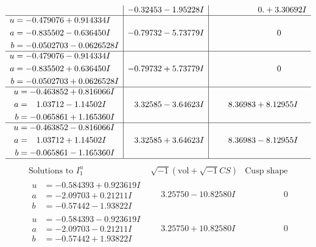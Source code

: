 \documentclass[1p]{elsarticle_modified}
\theoremstyle{definition}
\newcommand{\I}{\sqrt{-1}}
\begin{document}
$$\begin{array}{c|c|c}
 & -0.32453 - 1.95228 I & \phantom{-0.000000 -}0. + 3.30692 I \\ \hline\begin{aligned}
u &= -0.479076 + 0.914334 I \\
a &= -0.835502 - 0.636450 I \\
b &= -0.0502703 - 0.0626528 I\end{aligned}
 & -0.79732 - 5.73779 I & \phantom{-0.000000 } 0 \\ \hline\begin{aligned}
u &= -0.479076 - 0.914334 I \\
a &= -0.835502 + 0.636450 I \\
b &= -0.0502703 + 0.0626528 I\end{aligned}
 & -0.79732 + 5.73779 I & \phantom{-0.000000 } 0 \\ \hline\begin{aligned}
u &= -0.463852 + 0.816066 I \\
a &= \phantom{-}1.03712 - 1.14502 I \\
b &= -0.065861 + 1.165360 I\end{aligned}
 & \phantom{-}3.32585 - 3.64623 I & \phantom{-}8.36983 + 8.12955 I \\ \hline\begin{aligned}
u &= -0.463852 - 0.816066 I \\
a &= \phantom{-}1.03712 + 1.14502 I \\
b &= -0.065861 - 1.165360 I\end{aligned}
 & \phantom{-}3.32585 + 3.64623 I & \phantom{-}8.36983 - 8.12955 I\\
 \hline 
 \end{array}$$\newpage$$\begin{array}{c|c|c}  
\text{Solutions to }I^u_{1}& \I (\text{vol} + \sqrt{-1}CS) & \text{Cusp shape}\\
 \hline 
\begin{aligned}
u &= -0.584393 + 0.923619 I \\
a &= -2.09703 + 0.21211 I \\
b &= -0.57442 - 1.93822 I\end{aligned}
 & \phantom{-}3.25750 - 10.82580 I & \phantom{-0.000000 } 0 \\ \hline\begin{aligned}
u &= -0.584393 - 0.923619 I \\
a &= -2.09703 - 0.21211 I \\
b &= -0.57442 + 1.93822 I\end{aligned}
 & \phantom{-}3.25750 + 10.82580 I & \phantom{-0.000000 } 0 \\ \hline\begin{aligned}

\end{aligned}
\end{array}$$
\end{document}
